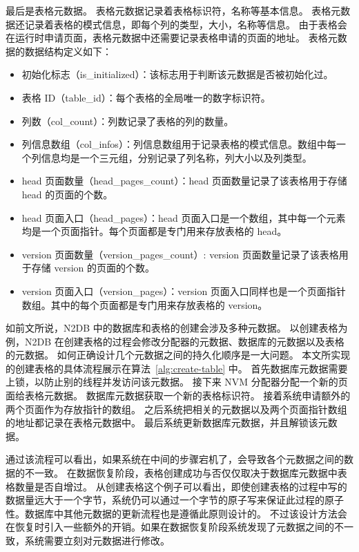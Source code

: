 最后是表格元数据。
表格元数据记录着表格标识符，名称等基本信息。
表格元数据还记录着表格的模式信息，即每个列的类型，大小，名称等信息。
由于表格会在运行时申请页面，表格元数据中还需要记录表格申请的页面的地址。
表格元数据的数据结构定义如下：
\begin{itemize}
    \item 初始化标志（is\_initialized）：该标志用于判断该元数据是否被初始化过。
    \item 表格 ID（table\_id）：每个表格的全局唯一的数字标识符。
    \item 列数（col\_count）：列数记录了表格的列的数量。
    \item 列信息数组（col\_infos）：列信息数组用于记录表格的模式信息。数组中每一个列信息均是一个三元组，分别记录了列名称，列大小以及列类型。
    \item head 页面数量（head\_pages\_count）：head 页面数量记录了该表格用于存储 head 的页面的个数。
    \item head 页面入口（head\_pages）：head 页面入口是一个数组，其中每一个元素均是一个页面指针。每个页面都是专门用来存放表格的 head。
    \item version 页面数量（version\_pages\_count）: version 页面数量记录了该表格用于存储 version 的页面的个数。
    \item version 页面入口（version\_pages）：version 页面入口同样也是一个页面指针数组。其中的每个页面都是专门用来存放表格的 version。
\end{itemize}


如前文所说，N2DB 中的数据库和表格的创建会涉及多种元数据。
以创建表格为例，N2DB 在创建表格的过程会修改分配器的元数据、数据库的元数据以及表格的元数据。
如何正确设计几个元数据之间的持久化顺序是一大问题。
本文所实现的创建表格的具体流程展示在算法~\ref{alg:create-table} 中。
首先数据库元数据需要上锁，以防止别的线程并发访问该元数据。
接下来 NVM 分配器分配一个新的页面给表格元数据。
数据库元数据获取一个新的表格标识符。
接着系统申请额外的两个页面作为存放指针的数组。
之后系统把相关的元数据以及两个页面指针数组的地址都记录在表格元数据中。
最后系统更新数据库元数据，并且解锁该元数据。

通过该流程可以看出，如果系统在中间的步骤宕机了，会导致各个元数据之间的数据的不一致。
在数据恢复阶段，表格创建成功与否仅仅取决于数据库元数据中表格数量是否自增过。
从创建表格这个例子可以看出，即使创建表格的过程中写的数据量远大于一个字节，系统仍可以通过一个字节的原子写来保证此过程的原子性。数据库中其他元数据的更新流程也是遵循此原则设计的。
不过该设计方法会在恢复时引入一些额外的开销。如果在数据恢复阶段系统发现了元数据之间的不一致，系统需要立刻对元数据进行修改。

